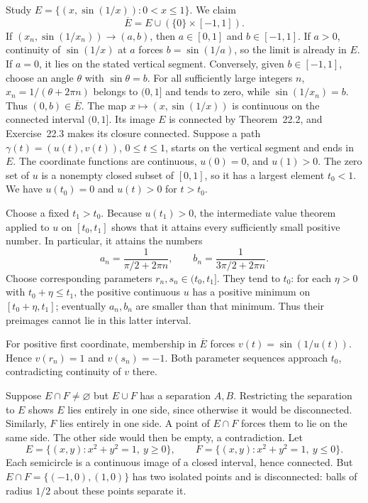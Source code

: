 \goal Study $E=\{(x,\sin(1/x)):0<x\le1\}$.
We claim
\[
 \overline E=E\cup(\{0\}\times[-1,1]).
\]
If $(x_n,\sin(1/x_n))\to(a,b)$, then $a\in[0,1]$ and $b\in[-1,1]$.
If $a>0$, continuity of $\sin(1/x)$ at $a$ forces $b=\sin(1/a)$,
so the limit is already in $E$. If $a=0$, it lies on the stated
vertical segment. Conversely, given $b\in[-1,1]$, choose an angle
$\theta$ with $\sin\theta=b$. For all sufficiently large integers $n$,
$x_n=1/(\theta+2\pi n)$ belongs to $(0,1]$ and tends to zero, while
$\sin(1/x_n)=b$. Thus $(0,b)\in\overline E$.
The map $x\mapsto(x,\sin(1/x))$ is continuous on the connected
interval $(0,1]$. Its image $E$ is connected by Theorem~22.2, and
Exercise~22.3 makes its closure connected.
Suppose a path $\gamma(t)=(u(t),v(t))$, $0\le t\le1$, starts on the
vertical segment and ends in $E$. The coordinate functions are
continuous, $u(0)=0$, and $u(1)>0$. The zero set of $u$ is a nonempty
closed subset of $[0,1]$, so it has a largest element $t_0<1$.
We have $u(t_0)=0$ and $u(t)>0$ for $t>t_0$.

Choose a fixed $t_1>t_0$. Because $u(t_1)>0$, the intermediate value
theorem applied to $u$ on $[t_0,t_1]$ shows that it attains every
sufficiently small positive number. In particular, it attains the
numbers
\[
 a_n=\frac1{\pi/2+2\pi n},\qquad
 b_n=\frac1{3\pi/2+2\pi n}.
\]
Choose corresponding parameters $r_n,s_n\in(t_0,t_1]$. They tend
to $t_0$: for each $\eta>0$ with $t_0+\eta\le t_1$, the positive
continuous $u$ has a positive minimum on $[t_0+\eta,t_1]$; eventually
$a_n,b_n$ are smaller than that minimum. Thus their preimages cannot
lie in this latter interval.

For positive first coordinate, membership in $\overline E$ forces
$v(t)=\sin(1/u(t))$. Hence $v(r_n)=1$ and $v(s_n)=-1$. Both parameter
sequences approach $t_0$, contradicting continuity of $v$ there.

Suppose $E\cap F\ne\varnothing$ but $E\cup F$ has a separation $A,B$.
Restricting the separation to $E$ shows $E$ lies entirely in one side,
since otherwise it would be disconnected. Similarly, $F$ lies entirely
in one side. A point of $E\cap F$ forces them to lie on the same side.
The other side would then be empty, a contradiction.
Let
\[
 E=\{(x,y):x^2+y^2=1,\ y\ge0\},\qquad
 F=\{(x,y):x^2+y^2=1,\ y\le0\}.
\]
Each semicircle is a continuous image of a closed interval, hence
connected. But $E\cap F=\{(-1,0),(1,0)\}$ has two isolated points
and is disconnected: balls of radius $1/2$ about these points separate
it.

